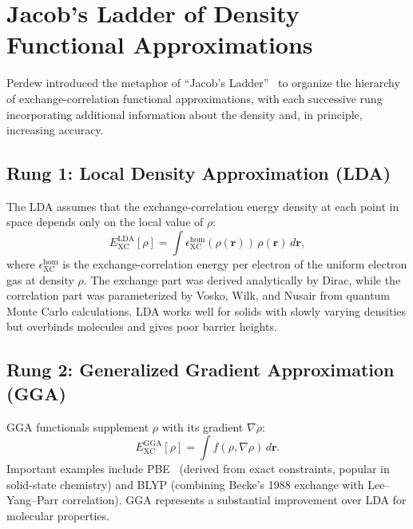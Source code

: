 \documentclass[11pt]{article}
\numberwithin{equation}{section}
\begin{document}
\section{Jacob's Ladder of Density Functional Approximations}
\label{sec:jacobs_ladder}

Perdew introduced the metaphor of ``Jacob's Ladder''~\cite{Perdew2001} to organize the hierarchy of exchange-correlation functional approximations, with each successive rung incorporating additional information about the density and, in principle, increasing accuracy.

\subsection{Rung 1: Local Density Approximation (LDA)}

The LDA assumes that the exchange-correlation energy density at each point in space depends only on the local value of $\rho$:
\begin{equation}
E_\text{XC}^\text{LDA}[\rho] = \int \epsilon_\text{XC}^\text{hom}(\rho(\mathbf{r}))\,\rho(\mathbf{r})\,d\mathbf{r},
\end{equation}
where $\epsilon_\text{XC}^\text{hom}$ is the exchange-correlation energy per electron of the uniform electron gas at density $\rho$. The exchange part was derived analytically by Dirac, while the correlation part was parameterized by Vosko, Wilk, and Nusair from quantum Monte Carlo calculations. LDA works well for solids with slowly varying densities but overbinds molecules and gives poor barrier heights.

\subsection{Rung 2: Generalized Gradient Approximation (GGA)}

GGA functionals supplement $\rho$ with its gradient $\nabla\rho$:
\begin{equation}
E_\text{XC}^\text{GGA}[\rho] = \int f(\rho, \nabla\rho)\,d\mathbf{r}.
\end{equation}
Important examples include PBE~\cite{PBE1996} (derived from exact constraints, popular in solid-state chemistry) and BLYP (combining Becke's 1988 exchange with Lee--Yang--Parr correlation). GGA represents a substantial improvement over LDA for molecular properties.
\end{document}
